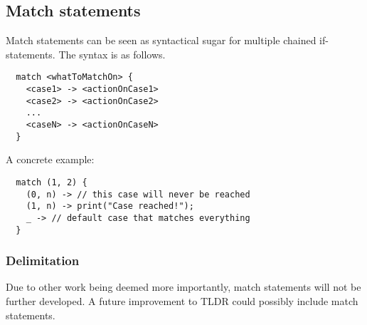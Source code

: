 \subsection{Match statements}
\label{subsec:matchStatements}

Match statements can be seen as syntactical sugar for multiple chained if-statements. The syntax is as follows.

\begin{verbatim}
  match <whatToMatchOn> {
    <case1> -> <actionOnCase1>
    <case2> -> <actionOnCase2>
    ...
    <caseN> -> <actionOnCaseN>
  }
\end{verbatim}

A concrete example:

\begin{verbatim}
  match (1, 2) {
    (0, n) -> // this case will never be reached
    (1, n) -> print("Case reached!");
    _ -> // default case that matches everything
  }
\end{verbatim}

\subsubsection{Delimitation}

Due to other work being deemed more importantly, match statements will not be further developed. A future improvement to TLDR could possibly include match statements.